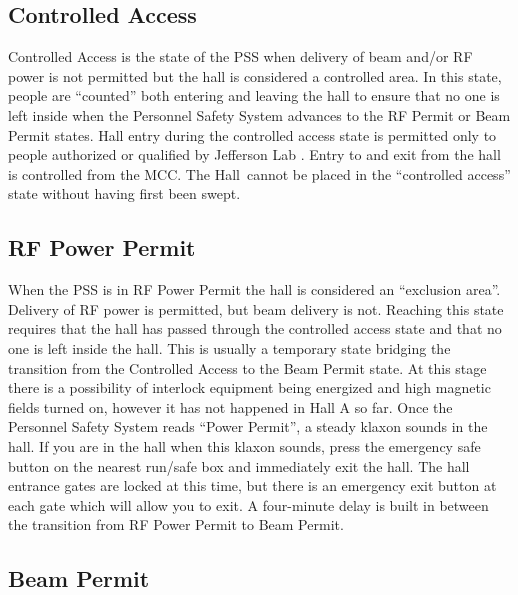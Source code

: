 \begin{safetyen}{10}{10}
\subsection{Controlled Access}
\end{safetyen}

 Controlled Access is the state of the PSS when delivery of beam
and/or RF power is not permitted but the hall is considered a
controlled area.  In this state, people are ``counted'' both entering
and leaving the hall to ensure that no one is left inside when the
Personnel Safety System advances to the RF Permit or Beam Permit
states.  Hall entry during the controlled access state is permitted
only to people authorized or qualified by Jefferson Lab .  Entry to
and exit from the hall is controlled from the MCC.  The Hall~cannot be
placed in the ``controlled access'' state without having first been
swept.

\begin{safetyen}{10}{10}
\subsection{RF Power Permit} 
\end{safetyen}

When the PSS is in RF Power Permit the hall is considered an
``exclusion area''.  Delivery of RF power is permitted, but beam
delivery is not.  Reaching this state requires that the hall has
passed through the controlled access state and that no one is left
inside the hall. This is usually a temporary state bridging the
transition from the Controlled Access to the Beam Permit state. 
At this stage there is a possibility of interlock equipment being energized
and high magnetic fields turned on, however it has not happened
in Hall A so far.
Once the Personnel Safety System reads ``Power Permit'', a steady klaxon
sounds in the hall. If you are in the hall when this klaxon sounds,
press the emergency safe button on the nearest run/safe box and
immediately exit the hall. The hall entrance gates are locked at this
time, but there is an emergency exit button at each gate which will
allow you to exit. A four-minute delay is built in between the
transition from RF Power Permit to Beam Permit.
 
\begin{safetyen}{10}{10}
\subsection{Beam Permit}
\end{safetyen}

